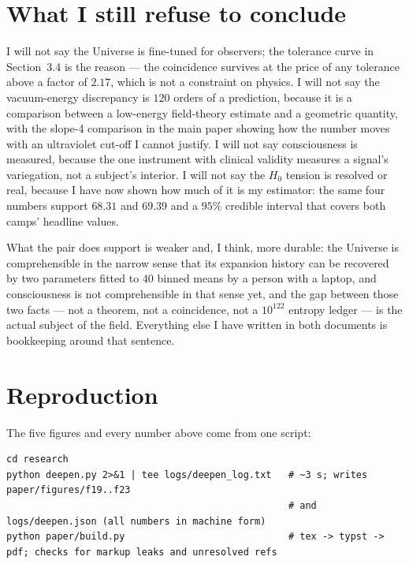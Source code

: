 \documentclass[11pt]{article}
\begin{document}
\section{What I still refuse to conclude}

I will not say the Universe is fine-tuned for observers; the tolerance curve in Section~3.4 is the
reason --- the coincidence survives at the price of any tolerance above a factor of $2.17$, which is
not a constraint on physics. I will not say the vacuum-energy discrepancy is $120$ orders of a
prediction, because it is a comparison between a low-energy field-theory estimate and a geometric
quantity, with the slope-4 comparison in the main paper showing how the number moves with an
ultraviolet cut-off I cannot justify. I will not say consciousness is measured, because the one
instrument with clinical validity measures a signal's variegation, not a subject's interior. I will not
say the $H_0$ tension is resolved or real, because I have now shown how much of it is my estimator: the
same four numbers support $68.31$ and $69.39$ and a $95\%$ credible interval that covers both camps'
headline values.

What the pair does support is weaker and, I think, more durable: the Universe is comprehensible in the
narrow sense that its expansion history can be recovered by two parameters fitted to 40 binned means by
a person with a laptop, and consciousness is not comprehensible in that sense yet, and the gap between
those two facts --- not a theorem, not a coincidence, not a $10^{122}$ entropy ledger --- is the actual
subject of the field. Everything else I have written in both documents is bookkeeping around that
sentence.

\appendix
\section{Reproduction}

The five figures and every number above come from one script:

\begin{verbatim}
cd research
python deepen.py 2>&1 | tee logs/deepen_log.txt   # ~3 s; writes paper/figures/f19..f23
                                                  # and logs/deepen.json (all numbers in machine form)
python paper/build.py                             # tex -> typst -> pdf; checks for markup leaks and unresolved refs
\end{verbatim}
\end{document}
